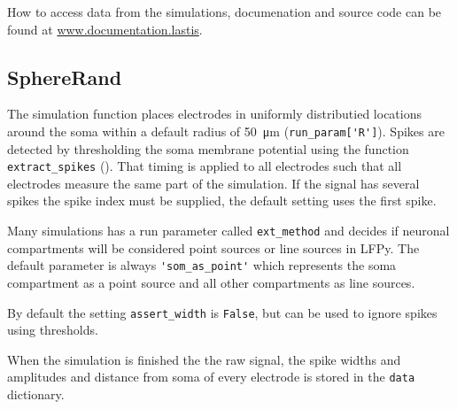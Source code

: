 \documentclass[altfont, fleqn]{uiophd}
\renewcommand{\cref}[1]{{\color{viridis_03}\mycref{#1}}}
\begin{document}
\begin{appendices}
How to access data from the simulations, 
documenation
and source code can be found at
\url{www.documentation.lastis}. 
\newline

\subsection{SphereRand}
\label{sec:sphererand}
The simulation function places
electrodes in uniformly distributied locations 
around the soma within a default radius of \SI{50}{\micro\metre}
(\verb+run_param['R']+). 
Spikes are detected by thresholding the soma membrane potential
using the function
\verb+extract_spikes+ 
(\cref{sec:frequent_functions}).
That timing is applied to all electrodes such that all electrodes measure
the same part of the simulation. 
If the signal has several spikes
the spike index must be supplied, the default setting uses the first spike.

Many simulations has a run parameter called
\verb+ext_method+ and decides
if neuronal compartments will be considered point sources
or line sources in LFPy. 
The default parameter is always 
\verb+'som_as_point'+ 
which represents the soma compartment as a point source and
all other compartments as line sources. 

By default the setting 
\verb+assert_width+ is 
\verb+False+, 
but can be used to ignore spikes using thresholds. 

When the simulation is finished the
the raw signal, the spike widths and amplitudes and distance from
soma of every electrode is stored in the \verb+data+ dictionary. 
\newline

\end{appendices}
\end{document}

